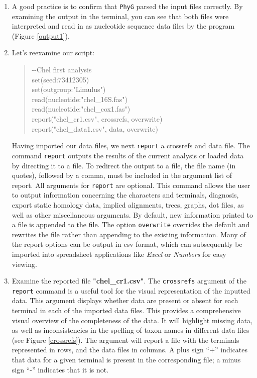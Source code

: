 \documentclass[]{article}
\newcommand{\phyg}{\texttt{PhyG} }
\begin{document}
\begin{enumerate}
\item A good practice is to confirm that \phyg parsed the input files correctly. 
By examining the output in the terminal, you can see that both files were
interpreted and read in as nucleotide sequence data files by the program 
(Figure \ref{output1}).

\item Let's reexamine our script:

	\begin{quote}
	-\/-Chel first analysis\\
	set(seed:73412305)\\
	set(outgroup:"Limulus")\\
	read(nucleotide:"chel\_16S.fas")\\
	read(nucleotide:"chel\_cox1.fas")\\
	report("chel\_cr1.csv", crossrefs, overwrite)\\
	report("chel\_data1.csv", data, overwrite)\\
	\end{quote}
	
Having imported our data files, we next \texttt{report} a crossrefs and data file.
The command \texttt{report} outputs the results of the current analysis or loaded 
data by directing it to a file. To redirect the output to a file, the file name (in quotes), 
followed by a comma, must be included in the argument list of report. All arguments 
for \texttt{report} are optional. This command allows the user to output information 
concerning the characters and terminals, diagnosis, export static homology data, 
implied alignments, trees, graphs, dot files, as well as other miscellaneous arguments. 
By default, new information printed to a file is appended to the file. The option 
\texttt{overwrite} overrides the default and rewrites the file rather than appending 
to the existing information. Many of the report options can be output in csv format, 
which can subsequently be imported into spreadsheet applications like \textit{Excel} 
or \textit{Numbers} for easy viewing. 

\item Examine the reported file \textbf{"chel\_cr1.csv"}. The \texttt{crossrefs} 
argument of the \texttt{report} command is a useful tool for the visual representation 
of the inputted data. This argument displays whether data are present or absent 
for each terminal in each of the imported data files. This provides a comprehensive 
visual overview of the completeness of the data. It will highlight missing data, as 
well as inconsistencies in the spelling of taxon names in different data files (see 
Figure \ref{crossrefs}). The argument will report a file with the terminals represented 
in rows, and the data files in columns. A plus sign ``+'' indicates that data for a given 
terminal is present in the corresponding file; a minus sign ``-'' indicates that it is not.


\end{enumerate}
\end{document}
